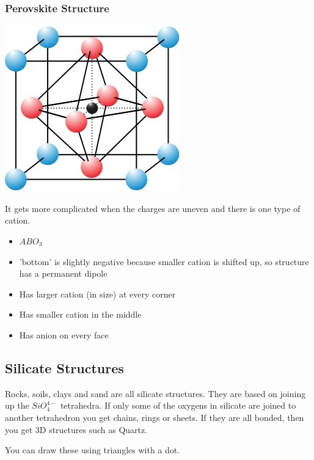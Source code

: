 \documentclass[12pt]{article}
\begin{document}
\subsubsection{Perovskite Structure}
\begin{center}
  \includegraphics[scale=0.4]{perovskitestructure} \end{center}
It gets more complicated when the charges are uneven and there is one type of cation.
\begin{itemize}
  \item $ABO_3$
  \item 'bottom' is slightly negative because smaller cation is shifted up, so structure has a permanent dipole 
  \item Has larger cation (in size) at every corner
  \item Has smaller cation in the middle 
  \item Has anion on every face
\end{itemize}

\subsection{Silicate Structures}
Rocks, soils, clays and sand are all silicate structures.
They are based on joining up the $SiO_4^{4-}$ tetrahedra.
If only some of the oxygens in silicate are joined to another tetrahedron you get chains, rings or sheets.
If they are all bonded, then you get 3D structures such as Quartz.

You can draw these using triangles with a dot. 
\end{document}
